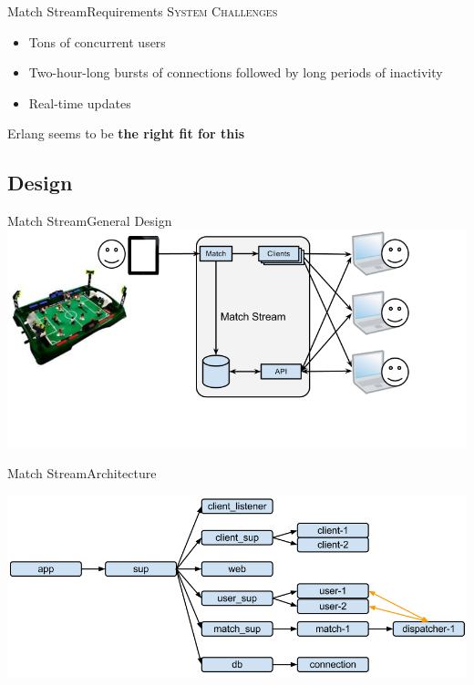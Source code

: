 \documentclass[utf8]{beamer}
\begin{document}
\begin{frame}{Match Stream}{Requirements}
	\textsc{System Challenges}
	\begin{itemize}
		\item<+-> Tons of concurrent users
		\item<+-> Two-hour-long bursts of connections followed by long periods of inactivity
		\item<+-> Real-time updates
	\end{itemize}
	\onslide<+->Erlang seems to be \textbf{the right fit for this}
\end{frame}

\subsection{Design}
\begin{frame}{Match Stream}{General Design}
	\includegraphics[width=\textwidth]{img/MatchStream.png}
\end{frame}
\begin{frame}{Match Stream}{Architecture}
	\begin{center}
		\includegraphics[width=\textwidth]{img/architecture-1.png}
	\end{center}
\end{frame}
\end{document}
